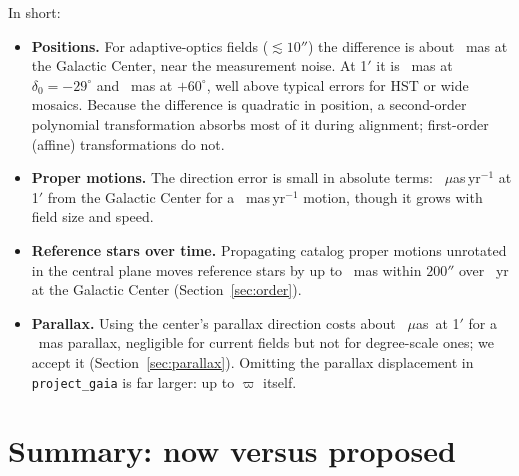 \documentclass[11pt]{article}
\newcommand{\code}[1]{\texttt{#1}}
\newcommand{\muas}{$\mu$as}
\begin{document}
In short:
\begin{itemize}
  \item \textbf{Positions.} For adaptive-optics fields ($\lesssim 10''$) the
    difference is about \PosDiffGCTen~mas at the Galactic Center, near the
    measurement noise. At 1$'$ it is \PosDiffGCArcmin~mas at
    $\delta_0=-29^\circ$ and \PosDiffHiArcmin~mas at $+60^\circ$, well above
    typical errors for HST or wide mosaics. Because the difference is
    quadratic in position, a second-order polynomial transformation absorbs
    most of it during alignment; first-order (affine) transformations do not.
  \item \textbf{Proper motions.} The direction error is small in absolute
    terms: \PMErrGCArcmin~\muas\,yr$^{-1}$ at 1$'$ from the Galactic Center for a
    \PMRef~mas\,yr$^{-1}$ motion, though it grows with field size and speed.
  \item \textbf{Reference stars over time.} Propagating catalog proper motions
    unrotated in the central plane moves reference stars by up to
    \PMMapMaxInner~mas within $200''$ over \PMMapDt~yr at the Galactic Center
    (Section~\ref{sec:order}).
  \item \textbf{Parallax.} Using the center's parallax direction costs about
    \PiErrGCArcmin~\muas\ at 1$'$ for a \PiRef~mas parallax, negligible for
    current fields but not for degree-scale ones; we accept it
    (Section~\ref{sec:parallax}). Omitting the parallax displacement in
    \code{project\_gaia} is far larger: up to $\varpi$ itself.
\end{itemize}

\section{Summary: now versus proposed}
\label{sec:summary}
\end{document}
